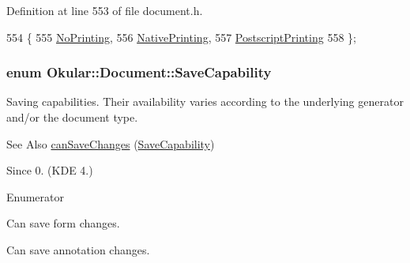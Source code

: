 Definition at line 553 of file document.\+h.


\begin{DoxyCode}
554         \{
555             \hyperlink{classOkular_1_1Document_ad5630e57d57d854b37ed4b362f7dab12a81a8466201e7cb753617f7af99308ae7}{NoPrinting},            
556             \hyperlink{classOkular_1_1Document_ad5630e57d57d854b37ed4b362f7dab12a5745a55426d5d26628e5f6246ef19b73}{NativePrinting},        
557             \hyperlink{classOkular_1_1Document_ad5630e57d57d854b37ed4b362f7dab12a4b3d87d5a23cf38f190a7da005453995}{PostscriptPrinting}     
558         \};
\end{DoxyCode}
\hypertarget{classOkular_1_1Document_a7aa93fc147bd5aa966d65477b5c5eae9}{
\subsubsection[{Save\+Capability}]{\setlength{\rightskip}{0pt plus 5cm}enum {\bf Okular\+::\+Document\+::\+Save\+Capability}}}\label{classOkular_1_1Document_a7aa93fc147bd5aa966d65477b5c5eae9}
Saving capabilities. Their availability varies according to the underlying generator and/or the document type.

\begin{DoxySeeAlso}{See Also}
\hyperlink{classOkular_1_1Document_a46772ecd6dc23f6e07fb358eef32924d}{can\+Save\+Changes} (\hyperlink{classOkular_1_1Document_a7aa93fc147bd5aa966d65477b5c5eae9}{Save\+Capability}) 
\end{DoxySeeAlso}
\begin{DoxySince}{Since}
0. (K\+D\+E 4.) 
\end{DoxySince}
\begin{Desc}
\item[Enumerator]\par
\begin{description}
\item[{\em 
\hypertarget{classOkular_1_1Document_a7aa93fc147bd5aa966d65477b5c5eae9af3700f1553625c9cf992b4c5cc783ccd}{Save\+Forms\+Capability}\label{classOkular_1_1Document_a7aa93fc147bd5aa966d65477b5c5eae9af3700f1553625c9cf992b4c5cc783ccd}
}]Can save form changes. \item[{\em 
\hypertarget{classOkular_1_1Document_a7aa93fc147bd5aa966d65477b5c5eae9ab39f6065bb5cff48353657ac469f827b}{Save\+Annotations\+Capability}\label{classOkular_1_1Document_a7aa93fc147bd5aa966d65477b5c5eae9ab39f6065bb5cff48353657ac469f827b}
}]Can save annotation changes. \end{description}
\end{Desc}


